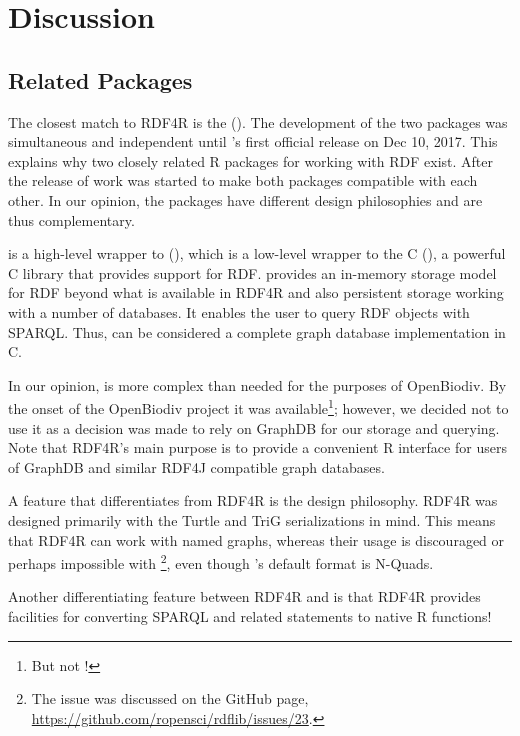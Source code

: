 \section{Discussion}

\subsection{Related Packages}

The closest match to RDF4R is the  (\cite{boettiger_rdflib:_2018}). The development of the two packages was simultaneous and independent until 's first official release on Dec 10, 2017. This explains why two closely related R packages for working with RDF exist. After the release of  work was started  to make both packages compatible with each other. In our opinion, the packages have different design philosophies and are thus complementary.

 is a high-level wrapper to  (\cite{jones_redland:_2016}), which is a low-level wrapper to the C  (\cite{beckett_redland_2014}), a powerful C library that provides support for RDF.  provides an in-memory storage model for RDF beyond what is available in RDF4R and also persistent storage working with a number of databases. It enables the user to query RDF objects with SPARQL. Thus,  can be considered a complete graph database implementation in C.

In our opinion,  is more complex than needed for the purposes of OpenBiodiv. By the onset of the OpenBiodiv project it was available\footnote{But not !}; however, we decided not to use it as a decision was made to rely on GraphDB for our storage and querying. Note that RDF4R's main purpose is to provide a convenient R interface for users of GraphDB and similar RDF4J compatible graph databases.

A feature that differentiates  from RDF4R is the design philosophy. RDF4R was designed primarily with the Turtle and TriG serializations in mind. This means that RDF4R can work with named graphs, whereas their usage is discouraged or perhaps impossible with \footnote{The issue was discussed on the  GitHub page, \url{https://github.com/ropensci/rdflib/issues/23}.}, even though 's default format is N-Quads.

Another differentiating feature between RDF4R and  is that RDF4R provides facilities for converting SPARQL and related statements to native R functions!

